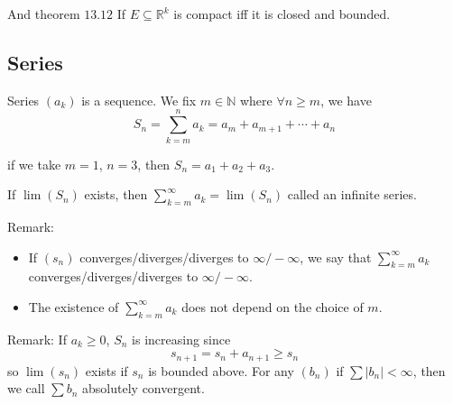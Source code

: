 \documentclass{report}
\begin{document}
And theorem $13.12$ If $E \subseteq \mathbb{R}^{k}$ is compact iff it is closed and bounded.

\begin{topic}
    \section{Series}
\end{topic}

\begin{definition}{Series}
    $(a_{k})$ is a sequence. We fix $m \in \mathbb{N}$ where $\forall n \geq m$, we have
        \begin{equation*}
            S_{n} = \sum_{k = m}^{n}a_{k} = a_{m} + a_{m + 1} + \cdots +a_{n}
        \end{equation*}
\end{definition}

\begin{examples}
    \begin{example}
        if we take $m = 1$, $n = 3$, then $S_{n} = a_{1} + a_{2} + a_{3}$.
    \end{example}
\end{examples}

If $\lim(S_{n})$ exists, then $\sum_{k = m}^{\infty}a_{k} = \lim(S_{n})$ called an infinite series.

Remark: 
    \begin{itemize}
        \item If $(s_{n})$ converges/diverges/diverges to $\infty/-\infty$, we say that $\sum_{k = m}^{\infty}a_{k}$ converges/diverges/diverges to $\infty/-\infty$.

        \item The existence of $\sum_{k = m}^{\infty}a_{k}$ does not depend on the choice of $m$. 
    \end{itemize}

Remark: If $a_{k} \geq 0$, $S_{n}$ is increasing since 
    \begin{equation*}
        s_{n + 1} = s_{n} + a_{n + 1} \geq s_{n}
    \end{equation*}
so $\lim(s_{n})$ exists if $s_{n}$ is bounded above. For any $(b_{n})$ if $\sum \lvert b_{n} \rvert < \infty$, then we call $\sum b_{n}$ absolutely convergent.
\end{document}
